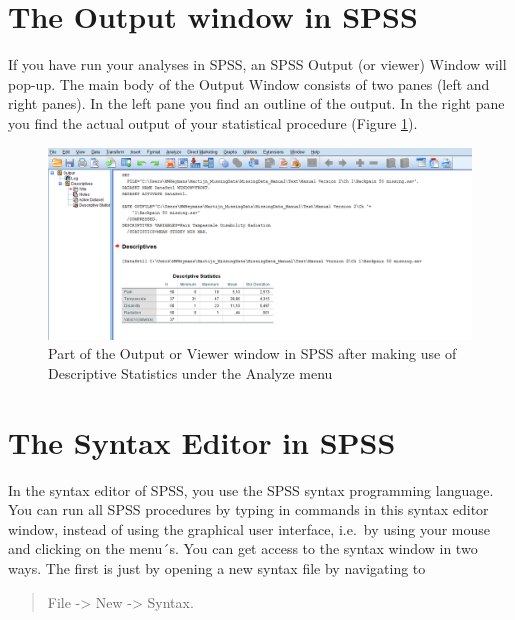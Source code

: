 \documentclass[
]{book}
\begin{document}
\hypertarget{the-output-window-in-spss}{%
\section{The Output window in SPSS}\label{the-output-window-in-spss}}

If you have run your analyses in SPSS, an SPSS Output (or viewer) Window will pop-up. The main body of the Output Window consists of two panes (left and right panes). In the left pane you find an outline of the output. In the right pane you find the actual output of your statistical procedure (Figure \ref{fig:fig5}).

\begin{figure}

{\centering \includegraphics[width=0.95\linewidth]{images/fig1.5} 

}

\caption{Part of the Output or Viewer window in SPSS after making use of Descriptive Statistics under the Analyze menu}\label{fig:fig5}
\end{figure}

\hypertarget{the-syntax-editor-in-spss}{%
\section{The Syntax Editor in SPSS}\label{the-syntax-editor-in-spss}}

In the syntax editor of SPSS, you use the SPSS syntax programming language. You can run all SPSS procedures by typing in commands in this syntax editor window, instead of using the graphical user interface, i.e.~by using your mouse and clicking on the menu´s. You can get access to the syntax window in two ways. The first is just by opening a new syntax file by navigating to

\begin{quote}
File -\textgreater{} New -\textgreater{} Syntax.
\end{quote}
\end{document}
